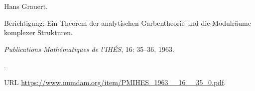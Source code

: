 Hans Grauert.

\newblock Berichtigung: Ein Theorem der analytischen Garbentheorie und die
  Modulräume komplexer Strukturen.

\newblock \emph{Publications Mathématiques de l'IHÉS}, 16: 35--36,
  1963.

\newblock {}.

\newblock URL \url{https://www.numdam.org/item/PMIHES_1963__16__35_0.pdf}.
